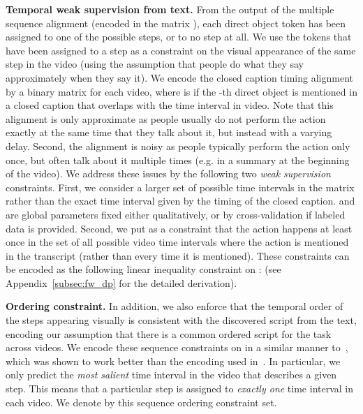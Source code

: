 \documentclass[10pt,twocolumn,letterpaper]{article}
\begin{document}
\setlength{\tabcolsep}{6pt}

\textbf{Temporal weak supervision from text.} 
From the output of the multiple sequence alignment (encoded in the matrix ),
each direct object token  has been assigned to one of the possible  steps,
or to no step at all. 
We use the tokens that have been assigned to a step as 
a constraint on the visual appearance of the same step in the video (using
the assumption that people do what they say approximately when they say it).
We encode the closed caption timing alignment by a binary matrix 
 for each video, 
where  is  if the -th direct object is mentioned in a closed caption 
that overlaps with the time interval  in video.
Note that this alignment is only approximate as people 
usually do not perform the action exactly at the same time that they talk about it, 
but instead with a varying delay.
Second, the alignment is noisy as people typically perform the action only 
once, but often talk about it multiple times (e.g. in a summary at the beginning of the video).
We address these issues by the following two \emph{weak supervision} constraints.
First, we consider a larger set of possible time intervals  in the matrix  rather than the exact time interval  given by the timing of the closed caption.
 and  are global parameters fixed either qualitatively, or by cross-validation
if labeled data is provided. 
Second, we put as a constraint that the action happens at least once in the set of all possible video time intervals where the action is mentioned in the transcript (rather than every time it is mentioned).
These constraints can be encoded as the following linear inequality constraint on : 
(see Appendix~\ref{subsec:fw_dp} for the detailed derivation). 

\textbf{Ordering constraint.} In addition, we also enforce that the temporal order of the steps appearing
visually is consistent with the discovered script from the text, encoding
our assumption that there is a common ordered script for the task across videos.
We encode these sequence constraints on  in a similar manner to~\cite{Bojanowski15weakly},
which was shown to work better than the encoding used in~\cite{Bojanowski14weakly}.
In particular, we only predict the \emph{most salient} time interval in the video that describes a given step.
This means that a particular step is assigned to \emph{exactly one} time interval in each video.
We denote by  this sequence ordering constraint set.
\end{document}

